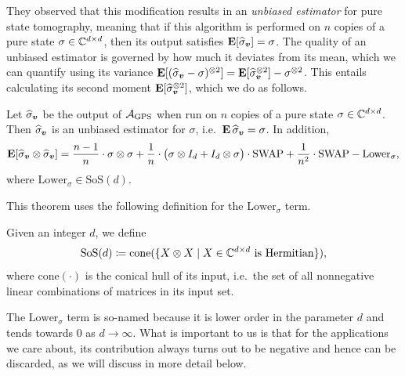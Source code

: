 \documentclass{article}
\newcommand{\gps}{\calA_{\mathrm{GPS}}}
\newcommand{\symsep}{\mathrm{SoS}}
\newcommand{\swap}{\mathrm{SWAP}}
\begin{document}
\noindent
They observed that this modification results in an \emph{unbiased estimator} for pure state tomography,
meaning that if this algorithm is performed on $n$ copies of a pure state $\sigma \in \mathbb C^{d\times d}$,
then its output satisfies $\mathop{\bf E\/} [\widehat{\sigma}_{\boldsymbol{v}}] = \sigma$.
The quality of an unbiased estimator is governed by how much it deviates from its mean,
which we can quantify using its variance $\mathop{\bf E\/}[(\widehat{\sigma}_{\boldsymbol{v}} - \sigma)^{\otimes 2}] = \mathop{\bf E\/} [\widehat{\sigma}_{\boldsymbol{v}}^{\otimes 2}] - \sigma^{\otimes 2}$.
This entails calculating its second moment $\mathop{\bf E\/} [\widehat{\sigma}_{\boldsymbol{v}}^{\otimes 2}]$,
which we do as follows.

\begin{theorem}
\label{thm:gps-moments}
Let $\widehat{\sigma}_{\boldsymbol{v}}$ be the output of $\gps$ when run on $n$ copies of a pure state $\sigma \in \mathbb C^{d \times d}$.
Then $\widehat{\sigma}_{\boldsymbol{v}}$ is an unbiased estimator for $\sigma$, i.e.\ $\mathop{\bf E\/} \widehat{\sigma}_{\boldsymbol{v}} = \sigma$.
In addition,
\begin{equation*}
    \E[\widehat{\sigma}_{\bv}\otimes \widehat{\sigma}_{\bv}] = \frac{n-1}{n} \cdot \sigma \otimes \sigma + \frac{1}{n} \cdot \big(\sigma \otimes I_d + I_d \otimes \sigma\big) \cdot \swap + \frac{1}{n^2} \cdot \swap-\mathrm{Lower}_{\sigma},
    \end{equation*}
    where $\mathrm{Lower}_{\sigma} \in \symsep(d)$.
\end{theorem}

This theorem uses the following definition for the $\mathrm{Lower}_{\sigma}$ term.
\begin{definition} \label{def:symsep}
Given an integer $d$, we define
\begin{equation*}
    \symsep(d) \coloneqq \mathrm{cone}(\{X \otimes X \mid \text{$X \in \C^{d \times d}$ is Hermitian}\}),
\end{equation*}
where $\mathrm{cone}(\cdot)$ is the conical hull of its input,
i.e.\ the set of all nonnegative linear combinations of matrices in its input set.
\end{definition}

\noindent
The $\mathrm{Lower}_{\sigma}$ term is so-named because it is lower order in the parameter $d$ and tends towards $0$ as $d \rightarrow \infty$.
        What is important to us is that for the applications we care about, its contribution always turns out to be negative and hence can be discarded, as we will discuss in more detail below.
\end{document}
